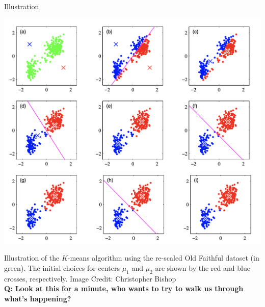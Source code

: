 \documentclass[10pt]{beamer}
\begin{document}
\begin{frame}{Illustration}
\begin{center}
\includegraphics[width=.7\textwidth]{images/k_means}
\end{center}
\scriptsize Illustration of the  $K$-means algorithm using the re-scaled Old Faithful dataset (in green).  The initial choices for centers $\mu_1$ and $\mu_2$ are shown by the red and blue crosses, respectively.
\vfill
\hfill \tiny Image Credit: Christopher Bishop \\
\tiny \bf{Q:}  Look at this for a minute, who wants to try to walk us through what's happening?
\end{frame}
\end{document}
